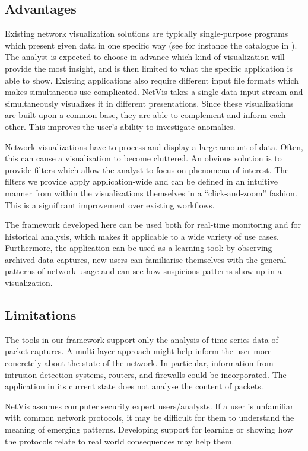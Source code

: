 \subsection{Advantages}
%
Existing network visualization solutions are typically single-purpose programs which present given
data in one specific way (see for instance the catalogue in \cite{marty2009applied}). The analyst is
expected to choose in advance which kind of visualization will provide the most insight, and is then
limited to what the specific application is able to show. Existing applications also require
different input file formats which makes simultaneous use complicated. NetVis takes a single data
input stream and simultaneously visualizes it in different presentations. Since these visualizations
are built upon a common base, they are able to complement and inform each other. This improves the
user's ability to investigate anomalies.

Network visualizations have to process and display a large amount of data. Often, this can cause a
visualization to become cluttered. An obvious solution is to provide filters which allow the analyst
to focus on phenomena of interest. The filters we provide apply application-wide and can be defined
in an intuitive manner from within the visualizations themselves in a ``click-and-zoom'' fashion.
This is a significant improvement over existing workflows.

The framework developed here can be used both for real-time monitoring and for historical analysis,
which makes it applicable to a wide variety of use cases. Furthermore, the application can be used
as a learning tool: by observing archived data captures, new users can familiarise themselves with
the general patterns of network usage and can see how suspicious patterns show up in a
visualization.

\subsection{Limitations}
%
The tools in our framework support only the analysis of time series data of packet captures. A
multi-layer approach might help inform the user more concretely about the state of the network. In
particular, information from intrusion detection systems, routers, and firewalls could be
incorporated. The application in its current state does not analyse the content of packets.

NetVis assumes computer security expert users/analysts. If a user is unfamiliar with common network
protocols, it may be difficult for them to understand the meaning of emerging patterns. Developing
support for learning or showing how the protocols relate to real world consequences may help them.

